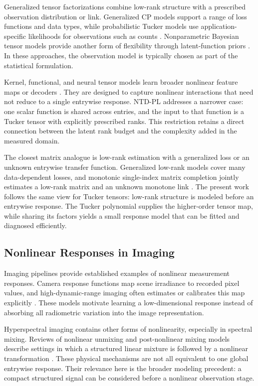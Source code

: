 Generalized tensor factorizations combine low-rank structure with a prescribed
observation distribution or link. Generalized CP models support a range of
loss functions and data types, while probabilistic Tucker models use
application-specific likelihoods for observations such as counts
\cite{hong2020generalized,schein2016bayesian}. Nonparametric Bayesian tensor
models provide another form of flexibility through latent-function priors
\cite{xu2011infinite}. In these approaches, the observation model is typically
chosen as part of the statistical formulation.

Kernel, functional, and neural tensor models learn broader nonlinear feature
maps or decoders
\cite{Luo2024LRTFR,liu2017deepcp,saragadam2024deeptensor,ahn2024neural}.
They are designed to capture nonlinear interactions that need not reduce to a
single entrywise response. NTD-PL addresses a narrower case: one scalar
function is shared across entries, and the input to that function is a Tucker
tensor with explicitly prescribed ranks. This restriction retains a direct
connection between the latent rank budget and the complexity added in the
measured domain.

The closest matrix analogue is low-rank estimation with a generalized loss or
an unknown entrywise transfer function. Generalized low-rank models cover many
data-dependent losses, and monotonic single-index matrix completion jointly
estimates a low-rank matrix and an unknown monotone link
\cite{Udell2016GLRM,Ganti2015SingleIndex}. The present work follows the same
view for Tucker tensors: low-rank structure is modeled before an entrywise
response. The Tucker polynomial supplies the higher-order tensor map, while
sharing its factors yields a small response model that can be fitted and
diagnosed efficiently.

\subsection{Nonlinear Responses in Imaging}

Imaging pipelines provide established examples of nonlinear measurement
responses. Camera response functions map scene irradiance to recorded pixel
values, and high-dynamic-range imaging often estimates or calibrates this map
explicitly \cite{Debevec1997HDR,Grossberg2004CameraResponse}. These models
motivate learning a low-dimensional response instead of absorbing all
radiometric variation into the image representation.

Hyperspectral imaging contains other forms of nonlinearity, especially in
spectral mixing. Reviews of nonlinear unmixing and post-nonlinear mixing models
describe settings in which a structured linear mixture is followed by a
nonlinear transformation
\cite{BioucasDias2012HyperspectralUnmixing,Altmann2012PostNonlinear,
Heylen2014NonlinearUnmixing}. These physical mechanisms are not all equivalent
to one global entrywise response. Their relevance here is the broader modeling
precedent: a compact structured signal can be considered before a nonlinear
observation stage.

